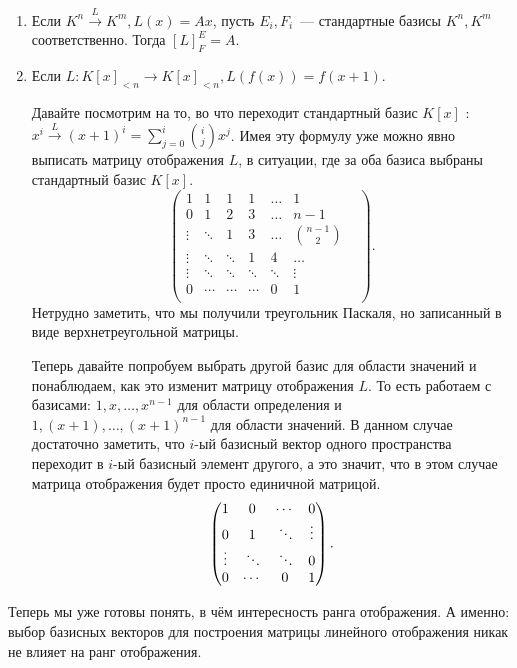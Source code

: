 \begin{examples}
    \begin{enumerate}
        \item
            Если $K^n\xrightarrow{L} K^m, L(x) = Ax$, пусть $E_i, F_i$~--- стандартные базисы $K^n, K^m$
            соответственно.
            Тогда $[L]^E_F = A$.
        \item
            Если $L: K[x]_{<n}\to K[x]_{<n}, L(f(x)) = f(x + 1)$.
            
            Давайте посмотрим на то, во что переходит стандартный базис $K[x]$ :
            $x^i\xrightarrow{L}(x+1)^i = \sum\limits_{j=0}^{i}{\binom{i}{j}x^j}$.
            Имея эту формулу уже можно явно выписать матрицу отображения $L$,
            в ситуации, где за оба базиса выбраны стандартный базис $K[x]$.
            \[
            \begin{pmatrix}
                1&1&1&1&\dots&1\\
                0&1&2&3&\dots&n-1\\
                \vdots&\ddots&1&3&\dots&\binom{n-1}{2}\\
                \vdots&\ddots&\ddots&1&4&\dots&\\
                \vdots&\ddots&\ddots&\ddots&\ddots&\vdots\\
                0&\cdots&\cdots&\cdots&0&1\\
            \end{pmatrix}
        .\] 
        Нетрудно заметить, что мы получили треугольник Паскаля, но записанный в виде 
        верхнетреугольной матрицы.

        Теперь давайте попробуем выбрать другой базис для области значений и понаблюдаем,
        как это изменит матрицу отображения $L$. То есть работаем с базисами:
        $1, x,\dots, x^{n-1}$ для области определения и $1,(x + 1), \dots, (x+1)^{n-1}$ для
        области значений.  В данном случае достаточно заметить, что $i$-ый базисный
        вектор одного пространства переходит в $i$-ый базисный элемент другого, а это
        значит, что в этом случае матрица отображения будет просто единичной матрицой.
        \[
        \begin{pmatrix}
            1&0&\cdots&0\\
            0&1&\rotatebox{140}{\ldots}&\vdots\\
            \vdots&\rotatebox{140}{\ldots}&\rotatebox{140}{\ldots}&0\\
            0&\cdots&0&1\\
        \end{pmatrix}
        .\] 
    \end{enumerate}
\end{examples}
\begin{motivation}
    Теперь мы уже готовы понять, в чём интересность ранга отображения.
    А именно: выбор базисных векторов для построения матрицы линейного отображения
    никак не влияет на ранг отображения.
\end{motivation}
